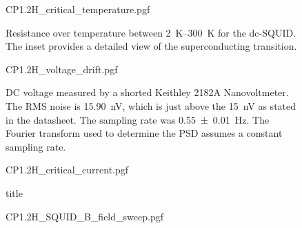 \begin{figure}
	\centering
	{CP1.2H_critical_temperature.pgf}
	\caption{Resistance over temperature between \qtyrange{2}{300}{\kelvin} for the dc-SQUID. The inset provides a detailed view of the superconducting transition.}
\end{figure}

\begin{figure}
	\centering
	{CP1.2H_voltage_drift.pgf}
	\caption{DC voltage measured by a shorted Keithley 2182A Nanovoltmeter. The RMS noise is \qty{15.90}{\nano\volt}, which is just above the \qty{15}{\nano\volt} as stated in the datasheet\cite{keithleyKeithley2182ANanovoltmeter}. The sampling rate was \qty{0.55\pm0.01}{\hertz}. The Fourier transform used to determine the PSD assumes a constant sampling rate.}
\end{figure}

\begin{figure}
	\centering
	{CP1.2H_critical_current.pgf}
	\caption{title}
\end{figure}

\begin{figure}
	\centering
	{CP1.2H_SQUID_B_field_sweep.pgf}
	\caption{}
\end{figure}